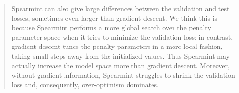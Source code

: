 \documentclass[]{article}
\begin{document}
\begin{enumerate}
\begin{quote}
			Spearmint can also give large differences between the validation and test losses, sometimes even larger than gradient descent.
			We think this is because Spearmint performs a more global search over the penalty parameter space when it tries to minimize the validation loss; in contrast, gradient descent tunes the penalty parameters in a more local fashion, taking small steps away from the initialized values.
			Thus Spearmint may actually increase the model space more than gradient descent.
			Moreover, without gradient information, Spearmint struggles to shrink the validation loss and, consequently, over-optimism dominates.
		\end{quote}
		
	\end{enumerate}
\end{document}
